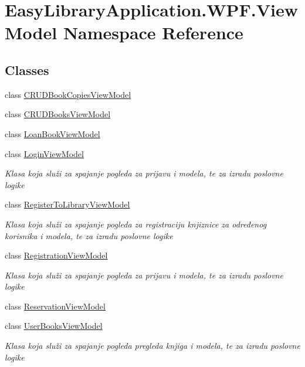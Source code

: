 \hypertarget{namespace_easy_library_application_1_1_w_p_f_1_1_view_model}{}\section{Easy\+Library\+Application.\+W\+P\+F.\+View\+Model Namespace Reference}
\label{namespace_easy_library_application_1_1_w_p_f_1_1_view_model}
\subsection*{Classes}
\begin{DoxyCompactItemize}
\item 
class \mbox{\hyperlink{class_easy_library_application_1_1_w_p_f_1_1_view_model_1_1_c_r_u_d_book_copies_view_model}{C\+R\+U\+D\+Book\+Copies\+View\+Model}}
\item 
class \mbox{\hyperlink{class_easy_library_application_1_1_w_p_f_1_1_view_model_1_1_c_r_u_d_books_view_model}{C\+R\+U\+D\+Books\+View\+Model}}
\item 
class \mbox{\hyperlink{class_easy_library_application_1_1_w_p_f_1_1_view_model_1_1_loan_book_view_model}{Loan\+Book\+View\+Model}}
\item 
class \mbox{\hyperlink{class_easy_library_application_1_1_w_p_f_1_1_view_model_1_1_login_view_model}{Login\+View\+Model}}
\begin{DoxyCompactList}\small\item\em Klasa koja služi za spajanje pogleda za prijavu i modela, te za izradu poslovne logike \end{DoxyCompactList}\item 
class \mbox{\hyperlink{class_easy_library_application_1_1_w_p_f_1_1_view_model_1_1_register_to_library_view_model}{Register\+To\+Library\+View\+Model}}
\begin{DoxyCompactList}\small\item\em Klasa koja služi za spajanje pogleda za registraciju knjiznice za određenog korisnika i modela, te za izradu poslovne logike \end{DoxyCompactList}\item 
class \mbox{\hyperlink{class_easy_library_application_1_1_w_p_f_1_1_view_model_1_1_registration_view_model}{Registration\+View\+Model}}
\begin{DoxyCompactList}\small\item\em Klasa koja služi za spajanje pogleda za prijavu i modela, te za izradu poslovne logike \end{DoxyCompactList}\item 
class \mbox{\hyperlink{class_easy_library_application_1_1_w_p_f_1_1_view_model_1_1_reservation_view_model}{Reservation\+View\+Model}}
\item 
class \mbox{\hyperlink{class_easy_library_application_1_1_w_p_f_1_1_view_model_1_1_user_books_view_model}{User\+Books\+View\+Model}}
\begin{DoxyCompactList}\small\item\em Klasa koja služi za spajanje pogleda pregleda knjiga i modela, te za izradu poslovne logike \end{DoxyCompactList}\end{DoxyCompactItemize}
